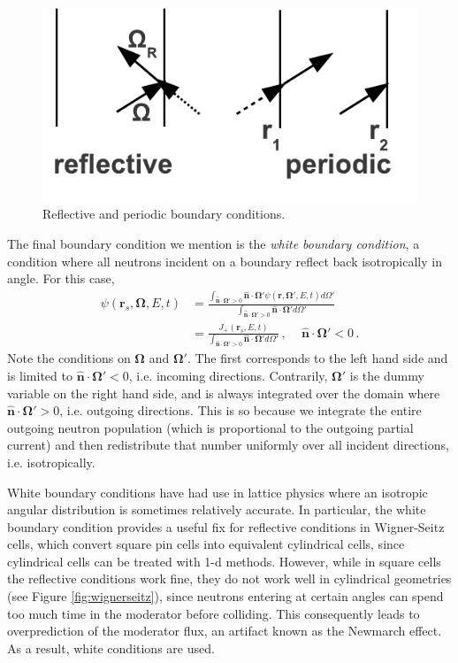 \begin{figure}[h] 
    \centering
    \includegraphics[keepaspectratio, width = 2.0 in]{reflectiveperiodic}
    \caption{Reflective and periodic boundary conditions.}
    \label{fig:reflectiveperiodic}
\end{figure}

The final boundary condition we mention is the \textit{white boundary condition}, a condition where all neutrons incident on a boundary reflect back isotropically in angle.  For this case,
\begin{equation}
\begin{split}
 \psi(\mathbf{r}_s,\mathbf{\Omega},E,t) &= \frac{ \int_{\mathbf{\hat{n}} \cdot \mathbf{\Omega}' > 0}   \mathbf{\hat{n}} \cdot \mathbf{\Omega}' \psi (\mathbf{r},\mathbf{\Omega}',E,t)d\Omega' } {  \int_{\mathbf{\hat{n}} \cdot \mathbf{\Omega}' > 0}  \mathbf{\hat{n}} \cdot \mathbf{\Omega}'  d\Omega'    }  \\
             &= \frac{ J_+ (\mathbf{r}_s,E,t) } {  \int_{\mathbf{\hat{n}} \cdot \mathbf{\Omega}' > 0}  \mathbf{\hat{n}} \cdot \mathbf{\Omega}'  d\Omega'    }\, , \, \, \, \,  \, \, \, \mathbf{\hat{n}} \cdot \mathbf{\Omega}' < 0 \, .
\end{split}
\end{equation}
Note the conditions on $\mathbf{\Omega}$ and $\mathbf{\Omega}'$.  The first corresponds to the left hand side and is limited to $\mathbf{\hat{n}} \cdot \mathbf{\Omega}' < 0$, i.e. incoming directions.  Contrarily, $\mathbf{\Omega}'$ is the dummy variable on the right hand side, and is always integrated over the domain where $\mathbf{\hat{n}} \cdot \mathbf{\Omega}' > 0$, i.e. outgoing directions.  This is so because we integrate the entire outgoing neutron population (which is proportional to the outgoing partial current) and then redistribute that number uniformly over all incident directions, i.e. isotropically.

White boundary conditions have had use in lattice physics where an isotropic angular distribution is sometimes relatively accurate.  In particular, the white boundary condition provides a useful fix for reflective conditions in Wigner-Seitz cells, which convert square pin cells into equivalent cylindrical cells, since cylindrical cells can be treated with 1-d methods.  However, while in square cells the reflective conditions work fine, they do not work well in cylindrical geometries (see Figure \ref{fig:wignerseitz}), since neutrons entering at certain angles can spend too much time in the moderator before colliding.  This consequently leads to overprediction of the moderator flux, an artifact known as the Newmarch effect. As a result, white conditions are used.


